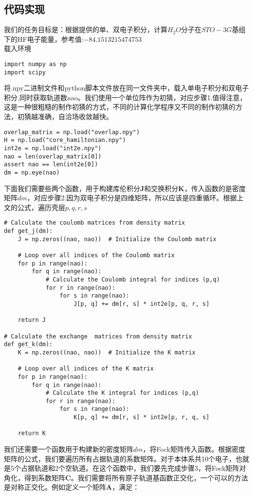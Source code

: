 \documentclass[12pt, a4paper, oneside]{ctexart}
\begin{document}
\subsection{代码实现}
我们的任务目标是：根据提供的单、双电子积分，计算$H_2O$分子在$STO-3G$基组下的HF电子能量，参考值:$-84.1513215474753$\\
载入环境
\begin{lstlisting}[style = Python]
import numpy as np
import scipy 
\end{lstlisting}
将.npy二进制文件和python脚本文件放在同一文件夹中，载入单电子积分和双电子积分,同时获取轨道数nao。我们使用一个单位阵作为初猜，对应步骤1.值得注意，这是一种很粗糙的制作初猜的方式，不同的计算化学程序又不同的制作初猜的方法，初猜越准确，自洽场收敛越快。
\begin{lstlisting}[style = Python]
overlap_matrix = np.load("overlap.npy")
H = np.load("core_hamiltonian.npy")
int2e = np.load("int2e.npy")
nao = len(overlap_matrix[0])
assert nao == len(int2e[0])
dm = np.eye(nao)
\end{lstlisting}
下面我们需要些两个函数，用于构建库伦积分\textbf{J}和交换积分\textbf{K}，传入函数的是密度矩阵$dm$，对应步骤2.因为双电子积分是四维矩阵，所以应该是四重循环。根据上文的公式，遍历壳层$p, q, r, s$
\begin{lstlisting}[style = Python]
# Calculate the coulomb matrices from density matrix
def get_j(dm):
    J = np.zeros((nao, nao))  # Initialize the Coulomb matrix

    # Loop over all indices of the Coulomb matrix
    for p in range(nao):
        for q in range(nao):
            # Calculate the Coulomb integral for indices (p,q)
            for r in range(nao):
                for s in range(nao):
                    J[p, q] += dm[r, s] * int2e[p, q, r, s]

    return J

# Calculate the exchange  matrices from density matrix
def get_k(dm):
    K = np.zeros((nao, nao))  # Initialize the K matrix

    # Loop over all indices of the K matrix
    for p in range(nao):
        for q in range(nao):
            # Calculate the K integral for indices (p,q)
            for r in range(nao):
                for s in range(nao):
                    K[p, q] += dm[r, s] * int2e[p, r, q, s]

    return K
\end{lstlisting}
我们还需要一个函数用于构建新的密度矩阵$dm$，将Fock矩阵传入函数。根据密度矩阵的公式，我们要遍历所有占据轨道的系数矩阵。对于本体系共10个电子，也就是5个占据轨道和2个空轨道。在这个函数中，我们要先完成步骤3，将Fock矩阵对角化，得到系数矩阵\textbf{C}。我们需要将所有原子轨道基函数正交化，一个可以的方法是对称正交化。例如定义一个矩阵\textbf{A}，满足：
\end{document}
